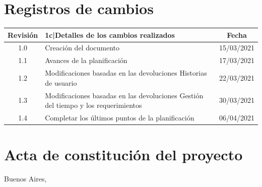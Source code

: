 \documentclass[11pt]{charter}
\begin{document}
\maketitle
\thispagestyle{empty}
\pagebreak


\thispagestyle{empty}
{\setlength{\parskip}{0pt}
\tableofcontents{}
}
\pagebreak


\section{Registros de cambios}
\label{sec:registro}


\begin{table}[ht]
\label{tab:registro}
\centering
\begin{tabularx}{\linewidth}{@{}|c|X|c|@{}}
\hline
\rowcolor[HTML]{C0C0C0} 
Revisión & {1}{c|}{\cellcolor[HTML]{C0C0C0}Detalles de los cambios realizados} & Fecha      \\ \hline
1.0      & Creación del documento                                          & 15/03/2021 \\ \hline
1.1      & Avances de la planificación & 17/03/2021 \\ \hline
1.2      & Modificaciones basadas en las devoluciones \newline
		   Historias de usuario											   & 22/03/2021 \\ \hline
1.3      & Modificaciones basadas en las devoluciones \newline
		   Gestión del tiempo y los requerimientos								   & 30/03/2021 \\ \hline
1.4      & Completar los últimos puntos de la planificación & 06/04/2021 \\ \hline
\end{tabularx}
\end{table}

\pagebreak



\section{Acta de constitución del proyecto}
\label{sec:acta}

\begin{flushright}
Buenos Aires, \fechaInicioName
\end{flushright}
\end{document}
